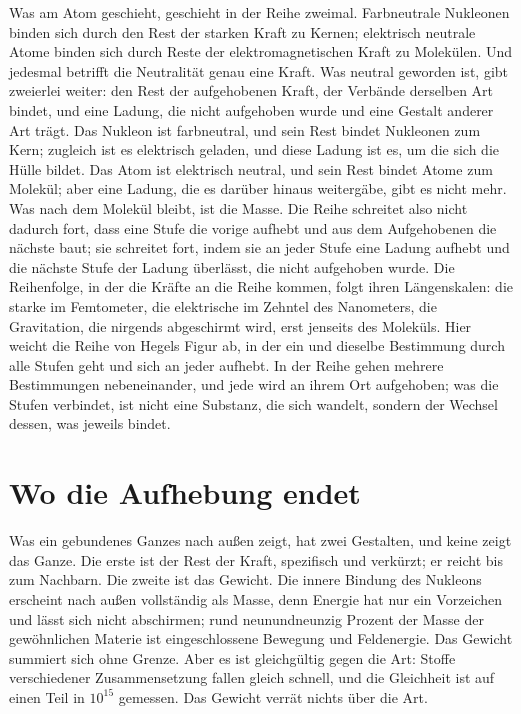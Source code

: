 \documentclass[11pt,a4paper]{article}
\begin{document}
Was am Atom geschieht, geschieht in der Reihe zweimal. Farbneutrale Nukleonen binden sich durch den Rest der starken Kraft zu Kernen; elektrisch neutrale Atome binden sich durch Reste der elektromagnetischen Kraft zu Molekülen. Und jedesmal betrifft die Neutralität genau eine Kraft. Was neutral geworden ist, gibt zweierlei weiter: den Rest der aufgehobenen Kraft, der Verbände derselben Art bindet, und eine Ladung, die nicht aufgehoben wurde und eine Gestalt anderer Art trägt. Das Nukleon ist farbneutral, und sein Rest bindet Nukleonen zum Kern; zugleich ist es elektrisch geladen, und diese Ladung ist es, um die sich die Hülle bildet. Das Atom ist elektrisch neutral, und sein Rest bindet Atome zum Molekül; aber eine Ladung, die es darüber hinaus weitergäbe, gibt es nicht mehr. Was nach dem Molekül bleibt, ist die Masse. Die Reihe schreitet also nicht dadurch fort, dass eine Stufe die vorige aufhebt und aus dem Aufgehobenen die nächste baut; sie schreitet fort, indem sie an jeder Stufe eine Ladung aufhebt und die nächste Stufe der Ladung überlässt, die nicht aufgehoben wurde. Die Reihenfolge, in der die Kräfte an die Reihe kommen, folgt ihren Längenskalen: die starke im Femtometer, die elektrische im Zehntel des Nanometers, die Gravitation, die nirgends abgeschirmt wird, erst jenseits des Moleküls. Hier weicht die Reihe von Hegels Figur ab, in der ein und dieselbe Bestimmung durch alle Stufen geht und sich an jeder aufhebt. In der Reihe gehen mehrere Bestimmungen nebeneinander, und jede wird an ihrem Ort aufgehoben; was die Stufen verbindet, ist nicht eine Substanz, die sich wandelt, sondern der Wechsel dessen, was jeweils bindet.

\section{Wo die Aufhebung endet}
\label{sec:grenze}

Was ein gebundenes Ganzes nach außen zeigt, hat zwei Gestalten, und keine zeigt das Ganze. Die erste ist der Rest der Kraft, spezifisch und verkürzt; er reicht bis zum Nachbarn. Die zweite ist das Gewicht. Die innere Bindung des Nukleons erscheint nach außen vollständig als Masse, denn Energie hat nur ein Vorzeichen und lässt sich nicht abschirmen; rund neunundneunzig Prozent der Masse der gewöhnlichen Materie ist eingeschlossene Bewegung und Feldenergie. Das Gewicht summiert sich ohne Grenze. Aber es ist gleichgültig gegen die Art: Stoffe verschiedener Zusammensetzung fallen gleich schnell, und die Gleichheit ist auf einen Teil in $10^{15}$ gemessen. Das Gewicht verrät nichts über die Art.
\end{document}
